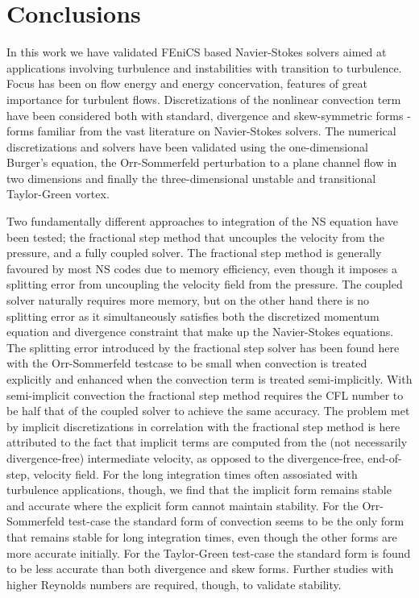 \section{Conclusions}

In this work we have validated FEniCS based Navier-Stokes solvers
aimed at applications involving turbulence and instabilities with
transition to turbulence. Focus has been on flow energy and energy
concervation, features of great importance for turbulent
flows. Discretizations of the nonlinear convection term have been
considered both with standard, divergence and skew-symmetric forms -
forms familiar from the vast literature on Navier-Stokes solvers. The
numerical discretizations and solvers have been validated using the
one-dimensional Burger's equation, the Orr-Sommerfeld perturbation to
a plane channel flow in two dimensions and finally the
three-dimensional unstable and transitional Taylor-Green vortex.

Two fundamentally different approaches to integration of the NS
equation have been tested; the fractional step method that uncouples
the velocity from the pressure, and a fully coupled solver. The
fractional step method is generally favoured by most NS codes due to
memory efficiency, even though it imposes a splitting error from
uncoupling the velocity field from the pressure. The coupled solver
naturally requires more memory, but on the other hand there is no
splitting error as it simultaneously satisfies both the discretized
momentum equation and divergence constraint that make up the
Navier-Stokes equations. The splitting error introduced by the
fractional step solver has been found here with the Orr-Sommerfeld
testcase to be small when convection is treated explicitly and
enhanced when the convection term is treated semi-implicitly. With
semi-implicit convection the fractional step method requires the CFL
number to be half that of the coupled solver to achieve the same
accuracy. The problem met by implicit discretizations in correlation
with the fractional step method is here attributed to the fact that
implicit terms are computed from the (not necessarily divergence-free)
intermediate velocity, as opposed to the divergence-free, end-of-step,
velocity field. For the long integration times often assosiated with
turbulence applications, though, we find that the implicit form
remains stable and accurate where the explicit form cannot maintain
stability. For the Orr-Sommerfeld test-case the standard form of
convection seems to be the only form that remains stable for long
integration times, even though the other forms are more accurate
initially. For the Taylor-Green test-case the standard form is found
to be less accurate than both divergence and skew forms. Further
studies with higher Reynolds numbers are required, though, to validate
stability.
